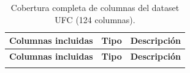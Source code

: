 \documentclass[11pt,a4paper]{article}
\begin{document}
\begingroup
\setlength{\emergencystretch}{0pt}
\setlength{\parskip}{0pt}
\small
\begin{longtable}{>{\raggedright\arraybackslash}p{5.6cm}>{\raggedright\arraybackslash}p{1.3cm}>{\raggedright\arraybackslash}p{5.1cm}}
\caption{Cobertura completa de columnas del dataset UFC (124 columnas).}\label{tab:variables}\\
\hline
\textbf{Columnas incluidas} & \textbf{Tipo} & \textbf{Descripción} \\
\hline
\endfirsthead

\hline
\textbf{Columnas incluidas} & \textbf{Tipo} & \textbf{Descripción} \\
\hline
\endhead

\hline
\endfoot

\bottomrule
\endlastfoot


\end{longtable}
\end{document}
